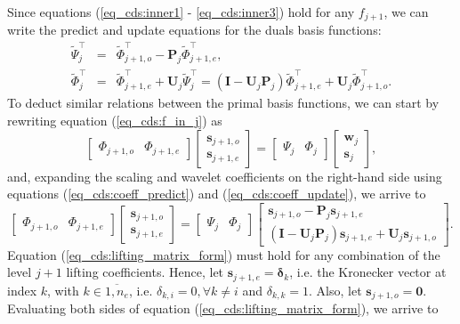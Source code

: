 \documentclass[graybox]{svmult}
\begin{document}
Since equations (\ref{eq_cds:inner1} - \ref{eq_cds:inner3}) hold for any $f_{j+1}$, we can write the predict and update equations for the duals basis functions:
\begin{eqnarray}
\tilde{\Psi}_j^\intercal & = & \tilde{\Phi}_{j+1,o}^\intercal - \mathbf{P}_j \tilde{\Phi}_{j+1,e}^\intercal, \\
\tilde{\Phi}_j^\intercal & = & \tilde{\Phi}_{j+1,e}^\intercal + \mathbf{U}_j \tilde{\Psi}_j^\intercal  =  (\mathbf{I} - \mathbf{U}_j\mathbf{P}_j) \tilde{\Phi}_{j+1,e}^\intercal + \mathbf{U}_j  \tilde{\Phi}_{j+1,o}^\intercal.
\end{eqnarray}
To deduct similar relations between the primal basis functions, we can start by rewriting equation (\ref{eq_cds:f_in_j}) as
\begin{equation}
\begin{bmatrix} \Phi_{j+1,o} & \Phi_{j+1,e} \end{bmatrix} \begin{bmatrix} \mathbf{s}_{j+1,o} \\ \mathbf{s}_{j+1,e} \end{bmatrix} = 
\begin{bmatrix}\Psi_j & \Phi_j \end{bmatrix} \begin{bmatrix} \mathbf{w}_j \\ \mathbf{s}_j \end{bmatrix},
\end{equation}
and, expanding the scaling and wavelet coefficients on the right-hand side using equations (\ref{eq_cds:coeff_predict}) and (\ref{eq_cds:coeff_update}), we arrive to
\begin{equation}
\begin{bmatrix} \Phi_{j+1,o} & \Phi_{j+1,e} \end{bmatrix} \begin{bmatrix} \mathbf{s}_{j+1,o} \\ \mathbf{s}_{j+1,e} \end{bmatrix} = 
\begin{bmatrix}\Psi_j & \Phi_j \end{bmatrix} \begin{bmatrix}  \mathbf{s}_{j+1,o} - \mathbf{P}_j \mathbf{s}_{j+1,e} \\ (\mathbf{I} - \mathbf{U}_j \mathbf{P}_j)\mathbf{s}_{j+1,e} + \mathbf{U}_j \mathbf{s}_{j+1,o} \end{bmatrix}.
\label{eq_cds:lifting_matrix_form}
\end{equation}
Equation (\ref{eq_cds:lifting_matrix_form}) must hold for any combination of the level $j+1$ lifting coefficients. Hence, let $\mathbf{s}_{j+1,e} = \mathbf{\delta}_k$, i.e. the Kronecker vector at index $k$, with $k \in \overline{1,n_e}$, i.e. $\delta_{k,i} = 0, \forall k \neq i$ and $\delta_{k,k} = 1$. Also, let $\mathbf{s}_{j+1,o} = \mathbf{0}$. Evaluating both sides of equation (\ref{eq_cds:lifting_matrix_form}), we arrive to
\end{document}
